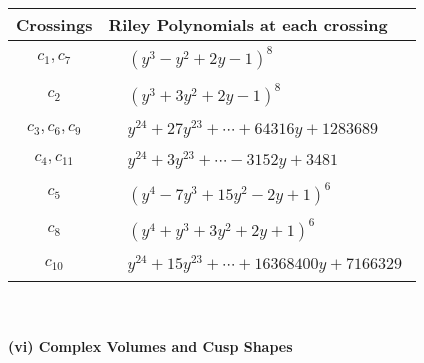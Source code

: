 \documentclass[1p]{elsarticle_modified}
\theoremstyle{definition}
\begin{document}
\begin{tabular}{m{50pt}|m{274pt}}
Crossings & \hspace{64pt}Riley Polynomials at each crossing \\
\hline $$\begin{aligned}c_{1},c_{7}\end{aligned}$$&$\begin{aligned}
&(y^3- y^2+2 y-1)^8
\end{aligned}$\\
\hline $$\begin{aligned}c_{2}\end{aligned}$$&$\begin{aligned}
&(y^3+3 y^2+2 y-1)^8
\end{aligned}$\\
\hline $$\begin{aligned}c_{3},c_{6},c_{9}\end{aligned}$$&$\begin{aligned}
&y^{24}+27 y^{23}+\cdots+64316 y+1283689
\end{aligned}$\\
\hline $$\begin{aligned}c_{4},c_{11}\end{aligned}$$&$\begin{aligned}
&y^{24}+3 y^{23}+\cdots-3152 y+3481
\end{aligned}$\\
\hline $$\begin{aligned}c_{5}\end{aligned}$$&$\begin{aligned}
&(y^4-7 y^3+15 y^2-2 y+1)^6
\end{aligned}$\\
\hline $$\begin{aligned}c_{8}\end{aligned}$$&$\begin{aligned}
&(y^4+y^3+3 y^2+2 y+1)^6
\end{aligned}$\\
\hline $$\begin{aligned}c_{10}\end{aligned}$$&$\begin{aligned}
&y^{24}+15 y^{23}+\cdots+16368400 y+7166329
\end{aligned}$\\
\hline
\end{tabular}\\~\\
\newpage\flushleft \textbf{(vi) Complex Volumes and Cusp Shapes}
\end{document}
